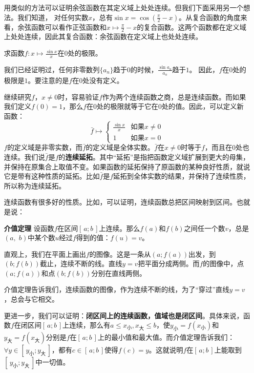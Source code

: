 \documentclass[12pt,UTF8]{ctexbook}
\begin{document}
用类似的方法可以证明余弦函数在其定义域上处处连续。但我们下面采用另一个想法。我们知道，
对任何实数$x$，总有$\sin{x} = \cos{\left(\frac{\pi}{2} - x\right)}$。从复合函数的角度来看，余弦函数可以看作正弦函数和$x\mapsto \frac{\pi}{2} - x$的复合函数。这两个函数都在定义域上处处连续，因此其复合函数：余弦函数在定义域上也处处连续。

\begin{et}
    求函数$f:x\mapsto \displaystyle\frac{\sin{x}}{x}$在$0$处的极限。
\end{et}
\begin{so}
    我们已经证明过，任何非零数列$\{a_n\}$趋于$0$的时候，$\displaystyle\frac{\sin{a_n}}{a_n}$趋于$1$。
    因此，$f$在$0$处的极限是$1$。要注意的是$f$在$0$处没有定义。
\end{so}

继续研究$f$，$x\neq 0$时，容易验证$f$作为两个连续函数之商，总是连续函数。而如果我们定义$f(0) = 1$，那么$f$在$0$处的极限就等于它在$0$处的值。因此，可以定义新函数：
$$
\bar{f}\mapsto \begin{cases}
    \displaystyle\frac{\sin{x}}{x} & \mbox{如果}x\neq 0 \\
    1 & \mbox{如果}x= 0
\end{cases}
$$
$f$的定义域是非零实数，而$\bar{f}$的定义域是全体实数。$\bar{f}$在$x\neq 0$时等于$f$，而且在$0$处也连续。我们说$\bar{f}$是$f$的\textbf{连续延拓}。其中“延拓”是指把函数定义域扩展到更大的母集，并保持在原集合上取值不变。如果函数的延拓保持了原函数的某种良好性质，就说它是带有这种性质的延拓。比如$\bar{f}$是$f$延拓到全体实数的结果，并保持了连续性质，所以称为连续延拓。

连续函数有很多好的性质。比如，可以证明，连续函数总把区间映射到区间。也就是说：
\begin{tm}{\textbf{介值定理}}
    设函数$f$在区间$[\,a;b\,]$上连续。那么$f(a)$和$f(b)$之间任一个数$v$，总是$(a, \,\,b)$中某个数$u$经过$f$得到的值：$f(u) = v$。
\end{tm}

直观上，我们在平面上画出$f$的图像。这是一条从$(a;f(a))$出发，到$(b;f(b))$截止，连续不断的线。直线$y = v$把平面分成两侧。而$f$的图像中，点$(a;f(a))$和点$(b;f(b))$分别在直线两侧。

介值定理告诉我们，连续函数的图像，作为连续不断的线，为了“穿过”直线$y = v$，总会与它相交。

更进一步，我们可以证明：\textbf{闭区间上的连续函数，值域也是闭区间}。具体来说，函数$f$在闭区间$[\,a;b\,]$上连续，那么有$a\leqslant x_{\text{小}} , x_{\text{大}} \leqslant b$，使$y_{\text{小}} = f(x_{\text{小}})$和$y_{\text{大}} = f(x_{\text{大}})$分别是$f$在$[\,a;b\,]$上的最小值和最大值。而介值定理告诉我们：$\forall y\in[\,y_{\text{小}};y_{\text{大}}\,]$，都有$c\in[\,a;b\,]$使得$f(c) = y$。这就说明$f$在$[\,a;b\,]$上能取到$[\,y_{\text{小}};y_{\text{大}}\,]$中一切值。
\end{document}

